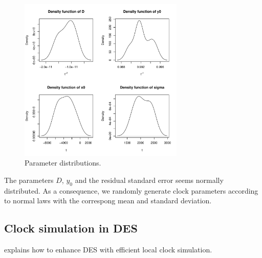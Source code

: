 \documentclass[11pt]{article}
\begin{document}
\begin{figure}[h!]
\centering
\includegraphics[width=0.70\textwidth]{pictures/parameters.pdf}
\caption{Parameter distributions.}
\label{fig:drift-noise}
\end{figure}

The parameters $D$, $y_0$ and the residual standard error seems normally distributed. As a consequence, we randomly generate clock parameters according to normal laws with the correspong mean and standard deviation.

\subsection{Clock simulation in DES}

\cite{ring2010clock} explains how to enhance DES with efficient local clock simulation.

\newpage



\end{document}
